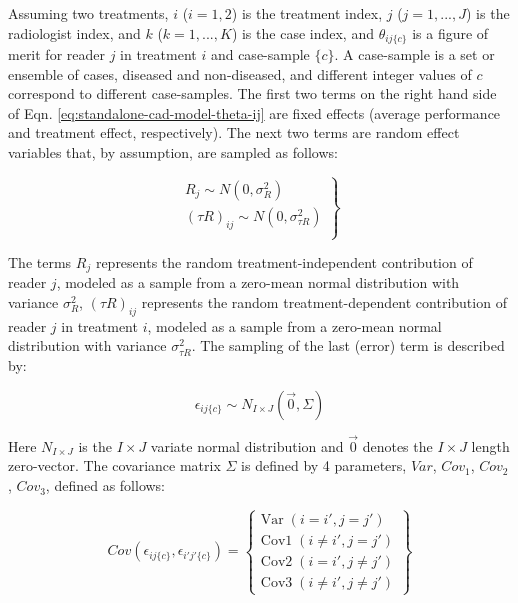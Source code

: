 \documentclass[
]{article}
\begin{document}
Assuming two treatments, \(i\) (\(i = 1, 2\)) is the treatment index, \(j\) (\(j = 1, ..., J\)) is the radiologist index, and \(k\) (\(k = 1, ..., K\)) is the case index, and \(\theta_{ij\{c\}}\) is a figure of merit for reader \(j\) in treatment \(i\) and case-sample \(\{c\}\). A case-sample is a set or ensemble of cases, diseased and non-diseased, and different integer values of \(c\) correspond to different case-samples. The first two terms on the right hand side of Eqn. \eqref{eq:standalone-cad-model-theta-ij} are fixed effects (average performance and treatment effect, respectively). The next two terms are random effect variables that, by assumption, are sampled as follows:

\begin{equation}
\left.
\begin{aligned}  
R_j \sim  N\left ( 0,\sigma_R^2 \right )\\
\left ( \tau R \right )_{ij} \sim N\left ( 0,\sigma_{\tau R}^2 \right )\\
\end{aligned}
\right \}
\label{eq:standalone-cad-model-rj-taur-sampling}
\end{equation}

The terms \(R_j\) represents the random treatment-independent contribution of reader \(j\), modeled as a sample from a zero-mean normal distribution with variance \(\sigma_R^2\), \(\left ( \tau R \right )_{ij}\) represents the random treatment-dependent contribution of reader \(j\) in treatment \(i\), modeled as a sample from a zero-mean normal distribution with variance \(\sigma_{\tau R}^2\). The sampling of the last (error) term is described by:

\begin{equation}
\epsilon_{ij\{c\}}\sim N_{I \times J}\left ( \vec{0} , \Sigma \right )
\label{eq:standalone-cad-eps-sampling}
\end{equation}

Here \(N_{I \times J}\) is the \(I \times J\) variate normal distribution and \(\vec{0}\) denotes the \(I \times J\) length zero-vector. The covariance matrix \(\Sigma\) is defined by 4 parameters, \(Var\), \(Cov_1\), \(Cov_2\), \(Cov_3\), defined as follows:

\begin{equation}
Cov(\epsilon_{ij\{c\}},\epsilon_{i'j'\{c\}}) =
\left\{\begin{matrix}
\text{Var} \; (i=i',j=j') \\
\text{Cov1} \; (i\ne i',j=j')\\ 
\text{Cov2} \; (i = i',j \ne j')\\ 
\text{Cov3} \; (i\ne i',j \ne j')
\end{matrix}\right\}
\label{eq:standalone-cad-or-cov}
\end{equation}
\end{document}
